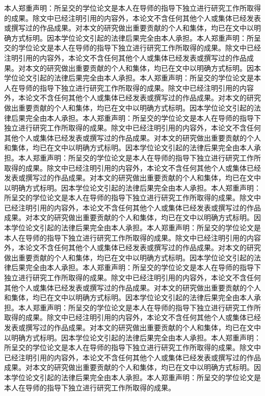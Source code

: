 \documentclass[class = professional, twoside,AutoFakeBold=3.17,AutoFakeSlant=0.2]{gdufe_master_thesis}
\begin{document}
本人郑重声明：所呈交的学位论文是本人在导师的指导下独立进行研究工作所取得的成果。除文中已经注明引用的内容外，本论文不含任何其他个人或集体已经发表或撰写过的作品成果。对本文的研究做出重要贡献的个人和集体，均已在文中以明确方式标明。因本学位论文引起的法律后果完全由本人承担。本人郑重声明：所呈交的学位论文是本人在导师的指导下独立进行研究工作所取得的成果。除文中已经注明引用的内容外，本论文不含任何其他个人或集体已经发表或撰写过的作品成果。对本文的研究做出重要贡献的个人和集体，均已在文中以明确方式标明。因本学位论文引起的法律后果完全由本人承担。本人郑重声明：所呈交的学位论文是本人在导师的指导下独立进行研究工作所取得的成果。除文中已经注明引用的内容外，本论文不含任何其他个人或集体已经发表或撰写过的作品成果。对本文的研究做出重要贡献的个人和集体，均已在文中以明确方式标明。因本学位论文引起的法律后果完全由本人承担。本人郑重声明：所呈交的学位论文是本人在导师的指导下独立进行研究工作所取得的成果。除文中已经注明引用的内容外，本论文不含任何其他个人或集体已经发表或撰写过的作品成果。对本文的研究做出重要贡献的个人和集体，均已在文中以明确方式标明。因本学位论文引起的法律后果完全由本人承担。本人郑重声明：所呈交的学位论文是本人在导师的指导下独立进行研究工作所取得的成果。除文中已经注明引用的内容外，本论文不含任何其他个人或集体已经发表或撰写过的作品成果。对本文的研究做出重要贡献的个人和集体，均已在文中以明确方式标明。因本学位论文引起的法律后果完全由本人承担。本人郑重声明：所呈交的学位论文是本人在导师的指导下独立进行研究工作所取得的成果。除文中已经注明引用的内容外，本论文不含任何其他个人或集体已经发表或撰写过的作品成果。对本文的研究做出重要贡献的个人和集体，均已在文中以明确方式标明。因本学位论文引起的法律后果完全由本人承担。本人郑重声明：所呈交的学位论文是本人在导师的指导下独立进行研究工作所取得的成果。除文中已经注明引用的内容外，本论文不含任何其他个人或集体已经发表或撰写过的作品成果。对本文的研究做出重要贡献的个人和集体，均已在文中以明确方式标明。因本学位论文引起的法律后果完全由本人承担。本人郑重声明：所呈交的学位论文是本人在导师的指导下独立进行研究工作所取得的成果。除文中已经注明引用的内容外，本论文不含任何其他个人或集体已经发表或撰写过的作品成果。对本文的研究做出重要贡献的个人和集体，均已在文中以明确方式标明。因本学位论文引起的法律后果完全由本人承担。本人郑重声明：所呈交的学位论文是本人在导师的指导下独立进行研究工作所取得的成果。除文中已经注明引用的内容外，本论文不含任何其他个人或集体已经发表或撰写过的作品成果。对本文的研究做出重要贡献的个人和集体，均已在文中以明确方式标明。因本学位论文引起的法律后果完全由本人承担。本人郑重声明：所呈交的学位论文是本人在导师的指导下独立进行研究工作所取得的成果。除文中已经注明引用的内容外，本论文不含任何其他个人或集体已经发表或撰写过的作品成果。对本文的研究做出重要贡献的个人和集体，均已在文中以明确方式标明。因本学位论文引起的法律后果完全由本人承担。本人郑重声明：所呈交的学位论文是本人在导师的指导下独立进行研究工作所取得的成果。
\the\baselineskip
\end{document}
